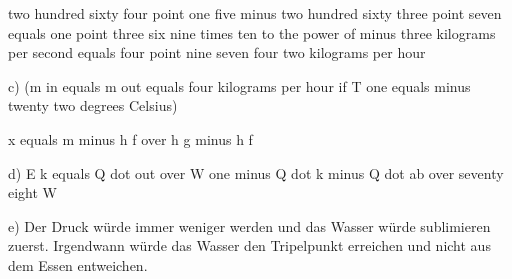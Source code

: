 two hundred sixty four point one five minus two hundred sixty three point seven equals one point three six nine times ten to the power of minus three kilograms per second equals four point nine seven four two kilograms per hour

c) (m in equals m out equals four kilograms per hour if T one equals minus twenty two degrees Celsius)

x equals m minus h f over h g minus h f

d) E k equals Q dot out over W one minus Q dot k minus Q dot ab over seventy eight W

e) Der Druck würde immer weniger werden und das Wasser würde sublimieren zuerst. Irgendwann würde das Wasser den Tripelpunkt erreichen und nicht aus dem Essen entweichen.